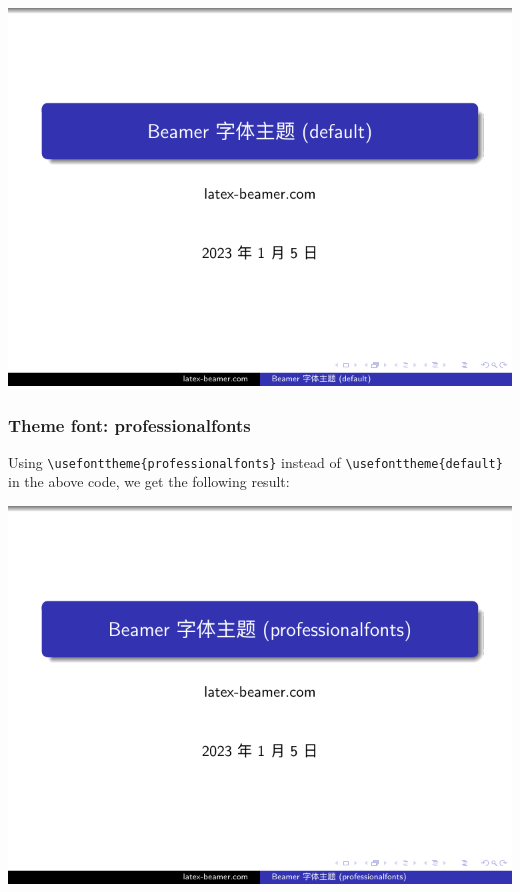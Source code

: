 \includegraphics[page=2]{examples/beamer/font-theme-default.pdf}

\subsubsection{Theme font: {\ttfamily professionalfonts}}

Using \verb|\usefonttheme{professionalfonts}| instead of \verb|\usefonttheme{default}| in the above code, we get the following result:

\includegraphics[page=1]{examples/beamer/font-theme-professionalfonts.pdf}

